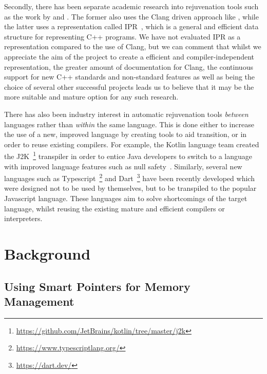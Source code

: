 \documentclass{mpaper}
\begin{document}
    Secondly, there has been separate academic research into rejuvenation tools such as the work by \citet{Huck2016} and \citet{Kumar2012}.
    The former also uses the Clang driven approach like \citet{Wright2013}, while the latter uses a representation called IPR~\cite{Dos2011}, which is a general and efficient data structure for representing C++ programs.
    We have not evaluated IPR as a representation compared to the use of Clang, but we can  comment that whilst we appreciate the aim of the project to create a efficient and compiler-independent representation, the greater amount of documentation for Clang, the continuous support for new C++ standards and non-standard features as well as being the choice of several other successful projects leads us to believe that it may be the more suitable and mature option for any such research.
    
    There has also been industry interest in automatic rejuvenation tools \emph{between} languages rather than \emph{within} the same language. 
    This is done either to increase the use of a new, improved language by creating tools to aid transition, or in order to reuse existing compilers.
    For example, the Kotlin language team created the J2K~\footnote{\url{https://github.com/JetBrains/kotlin/tree/master/j2k}} transpiler in order to entice Java developers to switch to a language with improved language features such as null safety~\cite{Mateus2019}. 
    Similarly, several new languages such as Typescript~\footnote{\url{https://www.typescriptlang.org/}} and Dart~\footnote{\url{https://dart.dev/}} have been recently developed which were designed not to be used by themselves, but to be transpiled to the popular Javascript language.
    These languages aim to solve shortcomings of the target language, whilst reusing the existing mature and efficient compilers or interpreters.




    \section{Background}\label{sec:background}
    
    \subsection{Using Smart Pointers for Memory Management}\label{subsec:using-smart-pointers-for-memory-management}
\end{document}

